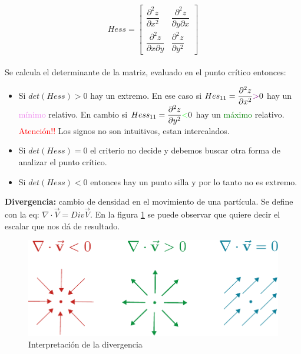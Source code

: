 \documentclass[12pt,a4paper]{article}
\begin{document}
$$
Hess =
\begin{bmatrix}
\dfrac{\partial ^2 z}{\partial x^2 } &  \dfrac{\partial ^2 z}{\partial y \partial x} \\
\dfrac{\partial ^2 z}{\partial x \partial y} & \dfrac{\partial ^2 z}{\partial y^2}
\end{bmatrix}
$$
\\
Se calcula el determinante de la matriz, evaluado en el punto crítico entonces:
\begin{itemize}
\item Si $det(Hess) > 0$ hay un extremo.  En ese caso si $Hes_{11} = \dfrac{\partial ^2 z}{\partial x^2} \textcolor{violet}{>} 0$ hay un \textcolor{violet}{mínimo} relativo.  En cambio si $Hess_{11} =  \dfrac{\partial ^2 z}{\partial y^2} \textcolor{green}{<} 0$ hay un \textcolor{green}{máximo} relativo. \textcolor{red}{Atención!!} Los signos no son intuitivos, estan intercalados.

\item Si $det(Hess) = 0$ el criterio no decide y debemos buscar otra forma de analizar el punto crítico.

\item Si $det(Hess) < 0$ entonces hay un punto silla y por lo tanto no es extremo.
\end{itemize}




  \textbf{Divergencia:} cambio de densidad en el movimiento de una partícula. Se define con la eq:
 $ \nabla  \cdot \vec{V} = Div \vec{V}$. En la figura \ref{fig:divergencia} se puede observar que quiere decir el escalar que nos dá de resultado.\\

 \begin{figure}[htbp]
   \begin{center}
       \includegraphics[scale=0.8]{divergencia.pdf}
     \caption{Interpretación de la divergencia}
     \label{fig:divergencia}
   \end{center}
 \end{figure}
\end{document}
